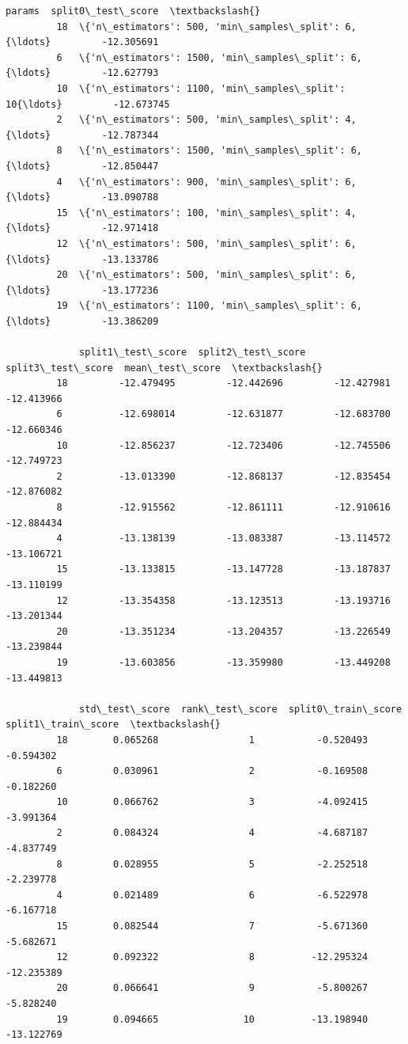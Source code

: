 \documentclass[11pt]{article}
\begin{document}
\begin{Verbatim}[commandchars=\\\{\}]
                                                        params  split0\_test\_score  \textbackslash{}
         18  \{'n\_estimators': 500, 'min\_samples\_split': 6, {\ldots}         -12.305691   
         6   \{'n\_estimators': 1500, 'min\_samples\_split': 6,{\ldots}         -12.627793   
         10  \{'n\_estimators': 1100, 'min\_samples\_split': 10{\ldots}         -12.673745   
         2   \{'n\_estimators': 500, 'min\_samples\_split': 4, {\ldots}         -12.787344   
         8   \{'n\_estimators': 1500, 'min\_samples\_split': 6,{\ldots}         -12.850447   
         4   \{'n\_estimators': 900, 'min\_samples\_split': 6, {\ldots}         -13.090788   
         15  \{'n\_estimators': 100, 'min\_samples\_split': 4, {\ldots}         -12.971418   
         12  \{'n\_estimators': 500, 'min\_samples\_split': 6, {\ldots}         -13.133786   
         20  \{'n\_estimators': 500, 'min\_samples\_split': 6, {\ldots}         -13.177236   
         19  \{'n\_estimators': 1100, 'min\_samples\_split': 6,{\ldots}         -13.386209   
         
             split1\_test\_score  split2\_test\_score  split3\_test\_score  mean\_test\_score  \textbackslash{}
         18         -12.479495         -12.442696         -12.427981       -12.413966   
         6          -12.698014         -12.631877         -12.683700       -12.660346   
         10         -12.856237         -12.723406         -12.745506       -12.749723   
         2          -13.013390         -12.868137         -12.835454       -12.876082   
         8          -12.915562         -12.861111         -12.910616       -12.884434   
         4          -13.138139         -13.083387         -13.114572       -13.106721   
         15         -13.133815         -13.147728         -13.187837       -13.110199   
         12         -13.354358         -13.123513         -13.193716       -13.201344   
         20         -13.351234         -13.204357         -13.226549       -13.239844   
         19         -13.603856         -13.359980         -13.449208       -13.449813   
         
             std\_test\_score  rank\_test\_score  split0\_train\_score  split1\_train\_score  \textbackslash{}
         18        0.065268                1           -0.520493           -0.594302   
         6         0.030961                2           -0.169508           -0.182260   
         10        0.066762                3           -4.092415           -3.991364   
         2         0.084324                4           -4.687187           -4.837749   
         8         0.028955                5           -2.252518           -2.239778   
         4         0.021489                6           -6.522978           -6.167718   
         15        0.082544                7           -5.671360           -5.682671   
         12        0.092322                8          -12.295324          -12.235389   
         20        0.066641                9           -5.800267           -5.828240   
         19        0.094665               10          -13.198940          -13.122769   
         

\end{Verbatim}
\end{document}
